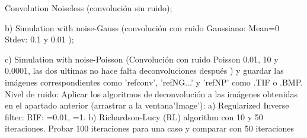 \documentclass{./packages/optica-article}
\begin{document}
      Convolution Noiseless (convolución sin ruido);
      
        b) Simulation with noise-Gauss (convolución con ruido Gaussiano: 
        Mean=0
        Stdev: 0.1 y 0.01 );
        
        c) Simulation with noise-Poisson (Convolución con ruido Poisson 0.01, 10 y 0.0001, las dos ultimas no
        hace falta deconvoluciones después ) y guardar las imágenes correspondientes como ’refconv’, ’refNG...’ y ’refNP’ como .TIF o .BMP. 
        Nivel de ruido:
		Aplicar los algoritmos de deconvolución a las imágenes obtenidas en el apartado anterior (arrastrar a la ventana’Image’): 
		a) Regularized Inverse filter: 
		RIF: =0.01, =1. 
		b) Richardson-Lucy (RL) algorithm con 10 y 50 iteraciones. Probar 100 iteraciones para una caso y comparar con 50 iteraciones

	

\end{document}
